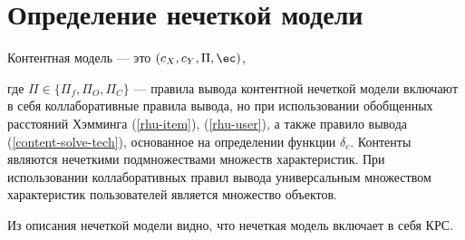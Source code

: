 
\section{Определение нечеткой модели}
\begin{defn}
	\label{content-model}
	Контентная модель --- это $(c_X, c_Y, \Pi, \ec)$,
\end{defn}
где $\Pi \in \{\Pi_f, \Pi_O, \Pi_C
	\}$ --- правила вывода контентной нечеткой модели включают
	в себя коллаборативные правила вывода, но при использовании
	обобщенных расстояний Хэмминга (\ref{rhu-item}), (\ref{rhu-user}),
	а также правило вывода (\ref{content-solve-tech}), основанное
	на определении функции $\delta_c$. Контенты являются нечеткими подмножествами
	множеств характеристик. При использовании коллаборативных правил вывода
	универсальным множеством характеристик пользователей является множество
	объектов.

	Из описания нечеткой модели видно, что нечеткая модель включает в себя КРС.


%




